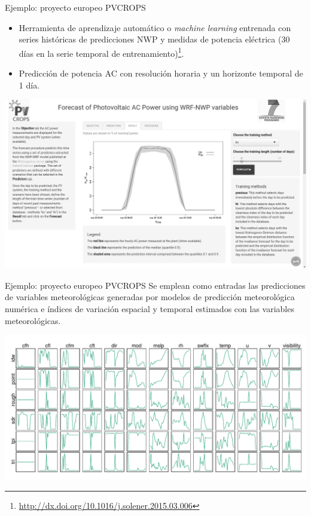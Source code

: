 \documentclass[aspectratio=169, usenames,svgnames,dvipsnames]{beamer}
\begin{document}
\begin{frame}[label={sec:org25e7838}]{Ejemplo: proyecto europeo PVCROPS}
\begin{itemize}
\item Herramienta de aprendizaje automático o \emph{machine learning}
entrenada con series históricas de predicciones NWP y medidas de
potencia eléctrica (30 días en la serie temporal de
entrenamiento)\footnote{\url{http://dx.doi.org/10.1016/j.solener.2015.03.006}}.
\item Predicción de potencia AC con resolución horaria y un horizonte
temporal de 1 día.
\end{itemize}


\begin{center}
\includegraphics[height=0.6\textheight]{../figs/ForecastShiny.png}
\end{center}
\end{frame}

\begin{frame}[label={sec:orgf75cb58}]{Ejemplo: proyecto europeo PVCROPS}
Se emplean como entradas las predicciones de variables
meteorológicas generadas por modelos de predicción meteorológica
numérica e índices de variación espacial y temporal estimados con
las variables meteorológicas.

\begin{center}
\includegraphics[height=0.7\textheight]{../figs/varsComplete.pdf}
\end{center}
\end{frame}
\end{document}
